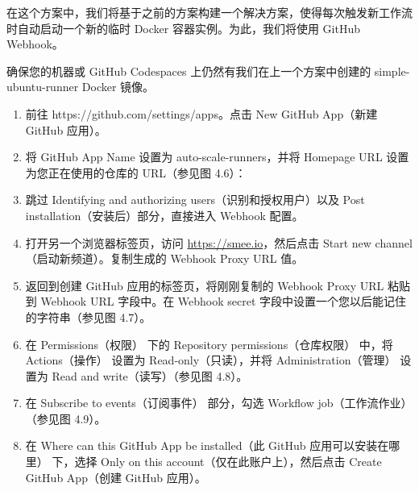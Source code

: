 在这个方案中，我们将基于之前的方案构建一个解决方案，使得每次触发新工作流时自动启动一个新的临时 Docker 容器实例。为此，我们将使用 GitHub Webhook。


确保您的机器或 GitHub Codespaces 上仍然有我们在上一个方案中创建的 simple-ubuntu-runner Docker 镜像。


\begin{enumerate}
\item 
前往 https://github.com/settings/apps。点击 New GitHub App（新建 GitHub 应用）。

\item 
将 GitHub App Name 设置为 auto-scale-runners，并将 Homepage URL 设置为您正在使用的仓库的 URL（参见图 4.6）：


\item 
跳过 Identifying and authorizing users（识别和授权用户）以及 Post installation（安装后）部分，直接进入 Webhook 配置。

\item 
打开另一个浏览器标签页，访问 \url{https://smee.io}，然后点击 Start new channel（启动新频道）。复制生成的 Webhook Proxy URL 值。

\item 
返回到创建 GitHub 应用的标签页，将刚刚复制的 Webhook Proxy URL 粘贴到 Webhook URL 字段中。在 Webhook secret 字段中设置一个您以后能记住的字符串（参见图 4.7）。


\item 
在 Permissions（权限） 下的 Repository permissions（仓库权限） 中，将 Actions（操作） 设置为 Read-only（只读），并将 Administration（管理） 设置为 Read and write（读写）（参见图 4.8）。


\item 
在 Subscribe to events（订阅事件） 部分，勾选 Workflow job（工作流作业）（参见图 4.9）。


\item 
在 Where can this GitHub App be installed（此 GitHub 应用可以安装在哪里） 下，选择 Only on this account（仅在此账户上），然后点击 Create GitHub App（创建 GitHub 应用）。


\end{enumerate}
